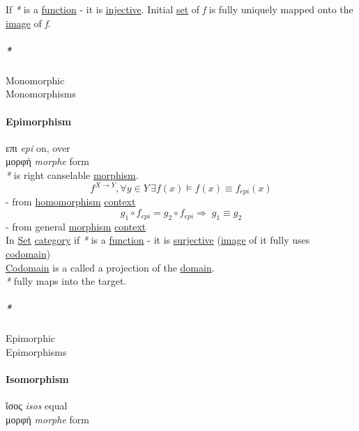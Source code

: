 \documentclass[11pt]{article}
\begin{document}
If \emph{*} is a \hyperref[orgeb5cddb]{function} - it is \hyperref[orgbdf10ff]{injective}. Initial \hyperref[orgbed80ba]{set} of \emph{f} is fully uniquely mapped onto the \hyperref[orgeb43f0e]{image} of \emph{f}.\\

\subparagraph{\emph{*}}
\label{sec:org06d7d3d}

\label{orga9f7512}Monomorphic\\
\label{orgfde584a}Monomorphisms\\

\paragraph{\label{org2e893f9}Epimorphism}
\label{sec:org633d99e}
επι \emph{epi} on, over\\
μορφή \emph{morphe} form\\

\emph{*} is right canselable \hyperref[orgad99fc6]{morphism}.\\
$$ f^{X \to Y}, \forall y \in Y \, \exists f(x) \vDash f(x) \equiv f_{epi}(x) $$ - from \hyperref[org01da5b8]{homomorphism} \hyperref[orgd623681]{context}\\
$$ g_1 \circ f_{epi} = g_2 \circ f_{epi} \Rightarrow \; g_1 \equiv g_2 $$ - from general \hyperref[orgad99fc6]{morphism} \hyperref[orgd623681]{context}\\

In \hyperref[orgbed80ba]{Set} \hyperref[org3e3a79b]{category} if \emph{*} is a \hyperref[orgeb5cddb]{function} - it is \hyperref[org7992b12]{surjective} (\hyperref[orgeb43f0e]{image} of it fully uses \hyperref[orgee70232]{codomain})\\
\hyperref[orgee70232]{Codomain} is a called a projection of the \hyperref[orgf784585]{domain}.\\

\emph{*} fully maps into the target.\\

\subparagraph{\emph{*}}
\label{sec:org942de59}

\label{org1a7048b}Epimorphic\\
\label{org94b12ab}Epimorphisms\\

\paragraph{\label{org3db0474}Isomorphism}
\label{sec:orgfb7bcb0}
ἴσος \emph{isos} equal\\
μορφή \emph{morphe} form\\
\end{document}
